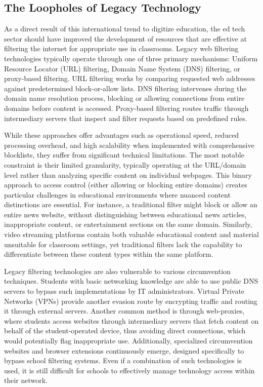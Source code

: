 \documentclass[
  titlepage]{article}
\begin{document}
\subsection{The Loopholes of Legacy
Technology}\label{the-loopholes-of-legacy-technology}

As a direct result of this international trend to digitize education,
the ed tech sector should have improved the development of resources
that are effective at filtering the internet for appropriate use in
classrooms. Legacy web filtering technologies typically operate through
one of three primary mechanisms: Uniform Resource Locator (URL)
filtering, Domain Name System (DNS) filtering, or proxy-based filtering.
URL filtering works by comparing requested web addresses against
predetermined block-or-allow lists. DNS filtering intervenes during the
domain name resolution process, blocking or allowing connections from
entire domains before content is accessed. Proxy-based filtering routes
traffic through intermediary servers that inspect and filter requests
based on predefined rules.

While these approaches offer advantages such as operational speed,
reduced processing overhead, and high scalability when implemented with
comprehensive blocklists, they suffer from significant technical
limitations. The most notable constraint is their limited granularity,
typically operating at the URL/domain level rather than analyzing
specific content on individual webpages. This binary approach to access
control (either allowing or blocking entire domains) creates particular
challenges in educational environments where nuanced content
distinctions are essential. For instance, a traditional filter might
block or allow an entire news website, without distinguishing between
educational news articles, inappropriate content, or entertainment
sections on the same domain. Similarly, video streaming platforms
contain both valuable educational content and material unsuitable for
classroom settings, yet traditional filters lack the capability to
differentiate between these content types within the same platform.

Legacy filtering technologies are also vulnerable to various
circumvention techniques. Students with basic networking knowledge are
able to use public DNS servers to bypass such implementations by IT
administrators. Virtual Private Networks (VPNs) provide another evasion
route by encrypting traffic and routing it through external servers.
Another common method is through web-proxies, where students access
websites through intermediary servers that fetch content on behalf of
the student-operated device, thus avoiding direct connections, which
would potentially flag inappropriate use. Additionally, specialized
circumvention websites and browser extensions continuously emerge,
designed specifically to bypass school filtering systems. Even if a
combination of such technologies is used, it is still difficult for
schools to effectively manage technology access within their network.
\end{document}
